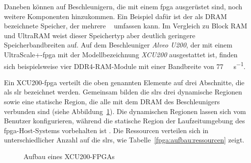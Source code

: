 Daneben können auf Beschleunigern, die mit einem \gls{fpga} ausgerüstet sind,
noch weitere Komponenten hinzukommen. Ein Beispiel dafür ist der als DRAM
bezeichnete Speicher, der mehrere \si{\gibi\byte} umfassen kann. Im Vergleich
zu Block RAM und UltraRAM weist dieser Speichertyp aber deutlich geringere
Speicherbandbreiten auf. Auf dem Beschleuniger \textit{Alveo U200}, der mit
einem UltraScale+-\gls{fpga} mit der Modellbezeichnung \textit{XCU200}
ausgestattet ist, finden sich beispielsweise vier DDR4-RAM-Module mit einer
Bandbreite von \SI{77}{\gibi\byte\per\second}.
\cites[vgl.][3]{alveo2019}[2]{alveobrief2018}

Ein XCU200-\gls{fpga} verteilt die oben genannten Elemente auf drei Abschnitte,
die als \gls{slr} bezeichnet werden. Gemeinsam bilden die \gls{slr}s drei
dynamische Regionen sowie eine statische Region, die alle mit dem DRAM des
Beschleunigers verbunden sind (siehe Abbildung~\ref{fpga:aufbau:alveoslr}). Die
dynamischen Regionen lassen sich vom Benutzer konfigurieren, während die
statische Region der Laufzeitumgebung des \gls{fpga}-Host-Systems vorbehalten
ist \cite[vgl.][4]{alveo2019}. Die Ressourcen verteilen sich in
unterschiedlicher Anzahl auf die \gls{slr}s, wie 
Tabelle~\ref{fpga:aufbau:ressourcen} zeigt.

\begin{figure}[htb]
    \centering
    \caption{Aufbau eines XCU200-FPGAs \cite[nach][5]{alveo2019}}
    \label{fpga:aufbau:alveoslr}
\end{figure}

